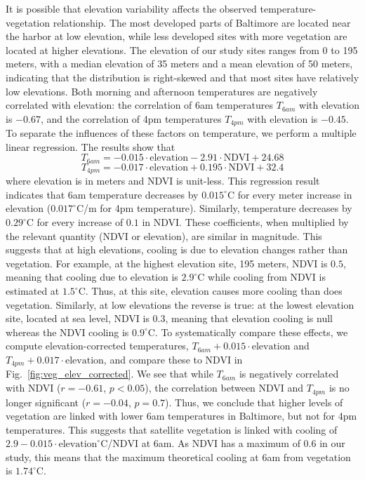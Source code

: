 \documentclass[draft,linenumbers]{agujournal}
\begin{document}
It is possible that elevation variability affects the observed  temperature-vegetation relationship. The most developed parts of Baltimore are located near the harbor at low elevation, while less developed sites with more vegetation are located at higher elevations. The elevation of our study sites ranges from 0 to 195 meters, with a median elevation of 35 meters and a mean elevation of 50 meters, indicating that the distribution is right-skewed and that most sites have relatively low elevations. Both morning and afternoon temperatures are negatively correlated with elevation: the correlation of 6am temperatures $T_{6am}$ with elevation is $-0.67$, and the correlation of 4pm temperatures $T_{4pm}$ with elevation is $-0.45$. To separate the influences of these factors on temperature, we perform a multiple linear regression. The results show that 
\[ T_{6am} = -0.015\cdot \text{elevation} -2.91 \cdot \text{NDVI} + 24.68\] 
\[ T_{4pm} = -0.017\cdot \text{elevation} +0.195 \cdot \text{NDVI} + 32.4\]
where elevation is in meters and NDVI is unit-less. 
This regression result indicates that 6am temperature decreases by $0.015^\circ$C for every meter increase in elevation ($0.017^\circ$C/m for 4pm temperature). Similarly, temperature decreases by $0.29^\circ$C for every increase of $0.1$ in NDVI. 
These coefficients, when multiplied by the relevant quantity (NDVI or elevation), are similar in magnitude. 
This suggests that at high elevations, cooling is due to elevation changes rather than vegetation.
 For example, at the highest elevation site, 195 meters, NDVI is $0.5$, meaning that cooling due to elevation is $2.9^\circ$C while cooling from NDVI is estimated at $1.5^\circ$C. Thus, at this site, elevation causes more cooling than does vegetation. 
 Similarly, at low elevations the reverse is true: at the lowest elevation site, located at sea level, NDVI is $0.3$, meaning that elevation cooling is null whereas the NDVI cooling is  $0.9^\circ$C. 
To systematically compare these effects, 
we compute elevation-corrected temperatures, $T_{6am} + 0.015\cdot \text{elevation}$ and $T_{4pm} + 0.017\cdot \text{elevation}$, and compare these to NDVI in Fig.~\ref{fig:veg_elev_corrected}. We see that while $T_{6am}$ is negatively correlated with NDVI ($r=-0.61$, $p<0.05$), the correlation between NDVI and $T_{4pm}$ is no longer significant ($r=-0.04$, $p=0.7$). 
Thus, we conclude that higher levels of vegetation are linked with lower 6am temperatures in Baltimore, but not for 4pm temperatures. This suggests that satellite vegetation is linked with cooling of $2.9 - 0.015\cdot \text{elevation} ^\circ$C/$\text{NDVI}$ at 6am. As NDVI has a maximum of $0.6$ in our study, this means that the maximum theoretical cooling at 6am from vegetation is $1.74^\circ$C. 
\end{document}
